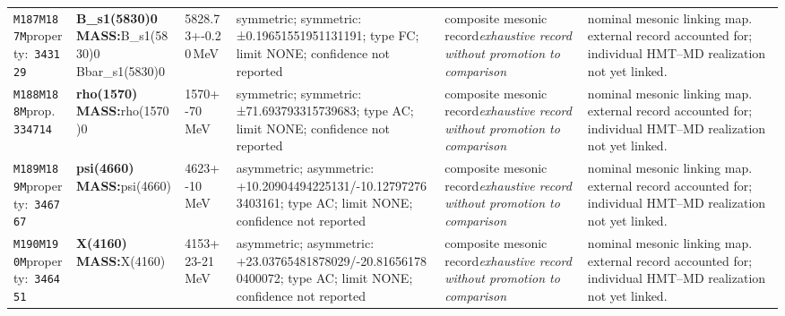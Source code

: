 \begin{landscape}
\begin{longtable}{L{1.85cm}L{4.45cm}L{2.35cm}L{4.05cm}L{3.35cm}L{7.15cm}}
\texttt{M187}\newline \texttt{M187M}\newline property:\ \texttt{343129} & \textbf{B\_\allowbreak{}s1(5830)0 MASS:}\newline B\_\allowbreak{}s1(5830)0 \textbar{}\allowbreak{} Bbar\_\allowbreak{}s1(5830)0 & 5828.73+-0.20\,MeV & symmetric; symmetric: ±0.19651551951131191; type FC; limit NONE; confidence not reported & composite mesonic record\newline \emph{exhaustive record without promotion to comparison} & nominal mesonic linking map. external record accounted for; individual HMT--MD realization not yet linked. \\
\texttt{M188}\newline \texttt{M188M}\newline prop.\ \texttt{334714} & \textbf{rho(1570) MASS:}\newline rho(1570)0 & 1570+-70\,MeV & symmetric; symmetric: ±71.693793315739683; type AC; limit NONE; confidence not reported & composite mesonic record\newline \emph{exhaustive record without promotion to comparison} & nominal mesonic linking map. external record accounted for; individual HMT--MD realization not yet linked. \\
\texttt{M189}\newline \texttt{M189M}\newline property:\ \texttt{346767} & \textbf{psi(4660) MASS:}\newline psi(4660) & 4623+-10\,MeV & asymmetric; asymmetric: +10.20904494225131/-10.127972763403161; type AC; limit NONE; confidence not reported & composite mesonic record\newline \emph{exhaustive record without promotion to comparison} & nominal mesonic linking map. external record accounted for; individual HMT--MD realization not yet linked. \\
\texttt{M190}\newline \texttt{M190M}\newline property:\ \texttt{346451} & \textbf{X(4160) MASS:}\newline X(4160) & 4153+23-21\,MeV & asymmetric; asymmetric: +23.03765481878029/-20.816561780400072; type AC; limit NONE; confidence not reported & composite mesonic record\newline \emph{exhaustive record without promotion to comparison} & nominal mesonic linking map. external record accounted for; individual HMT--MD realization not yet linked. \\

\end{longtable}
\end{landscape}
